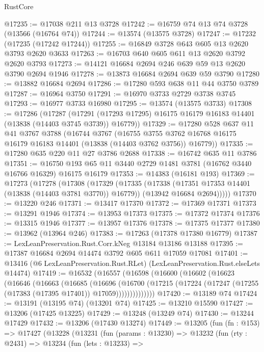 \begin{lexlean}{RustCore}
\begin{coremodule}
@17235 := @17038 @211 @13 @3728
@17242 := @16759 @74 @13 @74 @3728 (@13566 (@16764 @74))
@17244 := @13574 (@13575 @3728)
@17247 := @17232 (@17235 (@17242 @17244))
@17255 := @16849 @3728 @643 @605 @13 @2620 @3793 @2620 @3633
@17263 := @16703 @640 @605 @611 @13 @2620 @3792 @2620 @3793
@17273 := @14121 @16684 @2694 @246 @639 @59 @13 @2620 @3790 @2694 @1946
@17278 := @13873 @16684 @2694 @639 @59 @3790
@17280 := @13882 @16684 @2694
@17286 := @17280 @593 @638 @11 @44 @3750 @3789
@17287 := @16964 @3750
@17291 := @16970 @3733 @2729 @3738 @3745
@17293 := @16977 @3733 @16980
@17295 := @13574 (@13575 @3733)
@17308 := @17286
    (@17287
      (@17291 (@17293 @17295) @16175 @16179 @16183 @14401 (@13838 (@14403 @3745 @3739)) @16779))
@17329 := @17280
    @528
    @637
    @11
    @41
    @3767
    @3788
    (@16744
      @3767
      (@16755 @3755 @3762 @16768 @16175 @16179 @16183 @14401 (@13838 (@14403 @3762 @3756)) @16779))
@17335 := @17280 @635 @220 @11 @27 @3786 @2688
@17338 := @16742 @635 @11 @3786
@17351 := @16750 @193 @65 @11 @3440 @2729 @1481 @3781 (@16762 @3440 @16766 @16329) @16175 @16179
@17353 := @14383 (@16181 @193)
@17369 := @17273
    (@17278
      (@17308
        (@17329
          (@17335
            (@17338 (@17351 @17353 @14401 (@13838 (@14403 @3781 @3770)) @16779))
            (@13942 @16684 @2694)))))
@17370 := @13220 @246
@17371 := @13417 @17370
@17372 := @17369 @17371
@17373 := @13291 @1946
@17374 := @13953 @17373
@17375 := @17372 @17374
@17376 := @13315 @1946
@17377 := @13957 @17376
@17378 := @17375 @17377
@17380 := @13962 (@13964 @246)
@17383 := @17263 (@17378 @17380 @16779)
@17387 := LexLeanPreservation.Rust.Corr.kNeg @13184 @13186 @13188
@17395 := @17387 @16684 @2694 @14474 @3792 @605 @611 @17059 @17081
@17401 := @13416 (@6 LexLeanPreservation.Rust.RLet) (LexLeanPreservation.Rust.elseLets @14474)
@17419 := @16532
    (@16557
      (@16598
        (@16600
          (@16602
            (@16623
              (@16646
                (@16663
                  (@16685
                    (@16696
                      (@16700
                        (@17215
                          (@17224 (@17247 (@17255 (@17383 (@17395 @17401)) @17059))))))))))))))
@17420 := @13189 @74
@17424 := @13191 (@13195 @74) (@13201 @74)
@17425 := @13210 @15590
@17427 := @13206 (@17425 @13225)
@17429 := @13248 (@13249 @74)
@17430 := @13244 @17429
@17432 := @13206 (@17430 @13274)
@17449 := @13205
    (fun (fn : @153) =>
    @17427
      (@13228
        (@13231
          (fun (params : @13230) =>
          @13232
            (fun (rty : @2431) =>
            @13234
              (fun (lets : @13233) =>

\end{coremodule}
\end{lexlean}
